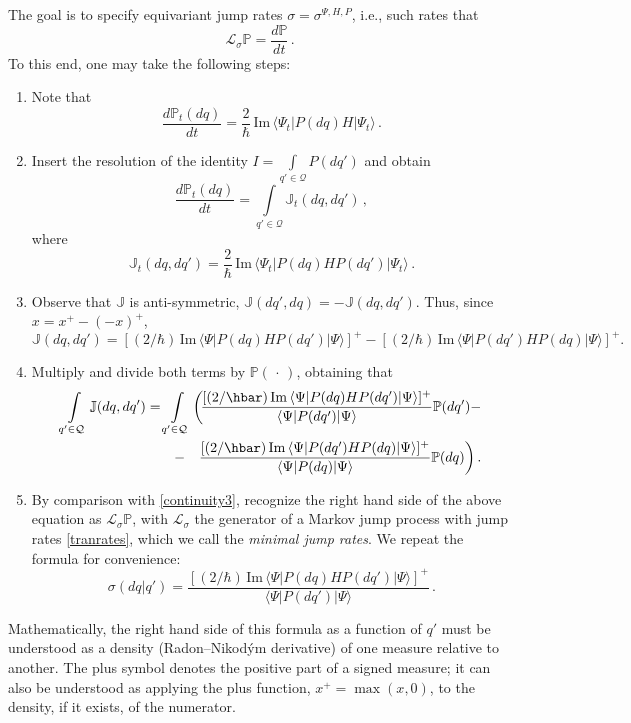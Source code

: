 \documentclass[12pt]{article}
\newcommand{\1}{\mathbf{1}} %
\renewcommand{\Im}{\mathrm{Im}} %
\renewcommand{\sp}[2]{\langle #1 | #2 \rangle} %
\newcommand{\conf}{\mathcal{Q}} %
\newcommand{\measure}{\mathbb{P}} %
\newcommand{\current}{\mathbb{J}}
\newcommand{\generator}{\mathscr{L}} %
\newcommand{\pov}{{P}}%
\begin{document}
The goal is to specify equivariant jump rates $\sigma = \sigma^{\Psi, H,
\pov}$, i.e., such rates that
\begin{equation}\label{equirates}
   \generator_\sigma \measure = \frac{d\measure}{dt} \,.
\end{equation}
To this end, one may take the following steps:

\begin{enumerate}
\item Note that
   \begin{equation}\label{dPdt}
     \frac{d\measure_t(dq)}{dt} = \frac{2}{\hbar} \, \Im \,
     \sp{\Psi_t}{\pov(dq) H| \Psi_t}\,.
   \end{equation}
\item Insert the resolution of the identity $I = 
\int\limits_{q'\in\conf}
   \pov(dq')$ and obtain
   \begin{equation}\label{dPdtJ}
     \frac{d\measure_t(dq)}{dt} =\int\limits_{q'\in\conf}
     \current_t(dq,dq') \,,
   \end{equation}
   where
   \begin{equation}\label{Jdef}
     \current_t(dq,dq') = \frac{2}{\hbar} \,
     \Im \, \sp{\Psi_t}{\pov(dq)H \pov(dq')| \Psi_t} \,.
   \end{equation}
\item Observe that $\current$ is anti-symmetric, $\current(dq',dq) = -
   \current(dq,dq')$.  Thus, since $x = x^+ - (-x)^+$,
   \[
     \current(dq,dq') = \left[(2/\hbar) \, \Im \, \sp{\Psi} {\pov(dq) H
     \pov(dq') |\Psi}\right]^+ - \left[(2/\hbar)\, \Im \, \sp{\Psi}
     {\pov(dq') H \pov(dq) |\Psi}\right]^+ .
   \]
\item Multiply and divide both terms by $\measure(\,\cdot\,)$,
   obtaining that
   \begin{eqnarray*}
     \int\limits_{q'\in\conf} \current(dq,dq') = \int\limits_{q'\in\conf}
     \bigg( \hspace{-3ex} &&
     \frac{[(2/\hbar) \, \Im \, \sp{\Psi} {\pov(dq) H \pov(dq')| 
\Psi}]^+}
     {\sp{\Psi}{\pov(dq')| \Psi}} \measure(dq') -
   \\-&&
     \frac{[(2/\hbar) \, \Im \, \sp{\Psi} {\pov(dq') H \pov(dq)| \Psi}
     ]^+} {\sp{\Psi} {\pov(dq)| \Psi}} \measure(dq) \bigg) \,.
\end{eqnarray*}
\item By comparison with \eqref{continuity3}, recognize the right hand
   side of the above equation as $\generator_\sigma \measure$, with
   $\generator_\sigma$ the generator of a Markov jump process with jump
   rates \eqref{tranrates}, which we call the \emph{minimal jump
   rates}. We repeat the formula for convenience:
   \[
     \sigma(dq|q')= \frac{[(2/\hbar) \, \Im \, \sp{\Psi} {\pov(dq) H
     \pov(dq')| \Psi}]^+}{\sp{\Psi}{\pov(dq')| \Psi}}\,.
   \]
\end{enumerate}
Mathematically, the right hand side of this formula as a function of
$q'$ must be understood as a density (Radon--Nikod{\'y}m derivative)
of one measure relative to another. The plus symbol denotes the
positive part of a signed measure; it can also be understood as
applying the plus function, $x^+ = \max (x,0)$, to the density, if it
exists, of the numerator.
\end{document}
